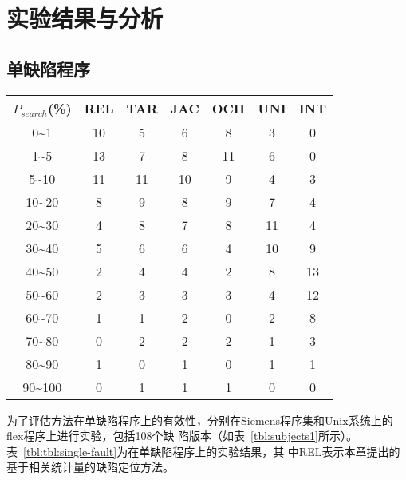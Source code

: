 \section{实验结果与分析}
\subsection{单缺陷程序}

\begin{center}
\label{tbl:single-siemens}
\begin{tabular}{ccccccc}
\toprule
$P_{search}$(\%) & REL & TAR & JAC & OCH & UNI & INT\\ \hline
0\textasciitilde1 & 10 & 5 & 6 & 8 & 3 & 0 \\ 
1\textasciitilde5 & 13 & 7 & 8 & 11 & 6 & 0 \\ 
5\textasciitilde10 & 11 & 11 & 10 & 9 & 4 & 3 \\ 
10\textasciitilde20 & 8 & 9 & 8 & 9 & 7 & 4 \\ 
20\textasciitilde30 & 4 & 8 & 7 & 8 & 11 & 4 \\ 
30\textasciitilde40 & 5 & 6 & 6 & 4 & 10 & 9 \\ 
40\textasciitilde50 & 2 & 4 & 4 & 2 & 8 & 13 \\ 
50\textasciitilde60 & 2 & 3 & 3 & 3 & 4 & 12 \\ 
60\textasciitilde70 & 1 & 1 & 2 & 0 & 2 & 8 \\ 
70\textasciitilde80 & 0 & 2 & 2 & 2 & 1 & 3 \\ 
80\textasciitilde90 & 1 & 0 & 1 & 0 & 1 & 1 \\ 
90\textasciitilde100 & 0 & 1 & 1 & 1 & 0 & 0 \\ 
\bottomrule
\end{tabular}
\end{center}

为了评估方法在单缺陷程序上的有效性，分别在Siemens程序集和Unix系统上的flex程序上进行实验，包括108个缺
陷版本（如表~\ref{tbl:subjects1}所示）。表~\ref{tbl:tbl:single-fault}为在单缺陷程序上的实验结果，其
中REL表示本章提出的基于相关统计量的缺陷定位方法。

